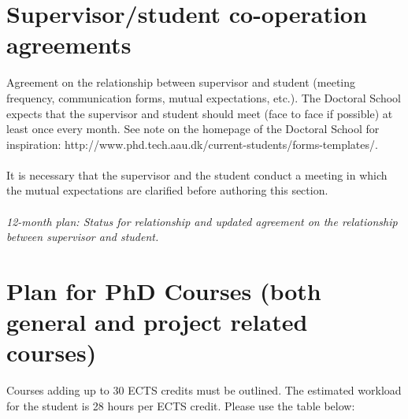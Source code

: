 \section{Supervisor/student co-operation agreements}
Agreement on the relationship between supervisor and student (meeting frequency, communication forms, mutual expectations, etc.). The Doctoral School expects that the supervisor and student should meet (face to face if possible) at least once every month. See note on the homepage of the Doctoral School for inspiration: http://www.phd.tech.aau.dk/current-students/forms-templates/. 
\\
\\
It is necessary that the supervisor and the student conduct a meeting in which the mutual expectations are clarified before authoring this section.
\\
\\
\textit{12-month plan: Status for relationship and updated agreement on the relationship between supervisor and student.}

\section{Plan for PhD Courses (both general and project related courses)}
Courses adding up to 30 ECTS credits must be outlined. The estimated workload for the student is 28 hours per ECTS credit. Please use the table below: 


